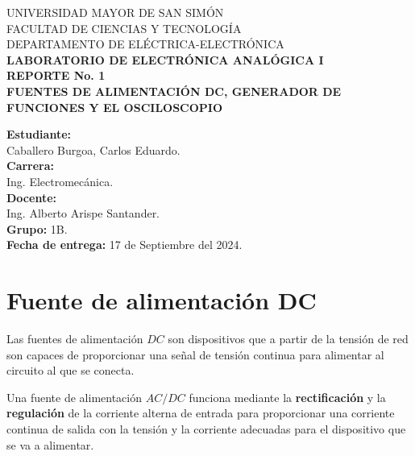 \documentclass[letter,twoside,11pt]{article}
\begin{document}
\begin{titlepage}
    \begin{center}
        {\Large UNIVERSIDAD MAYOR DE SAN SIMÓN}\\
        \vspace*{0.15cm}
        {\large FACULTAD DE CIENCIAS Y TECNOLOGÍA}\\
        \vspace*{0.10cm}
        DEPARTAMENTO DE ELÉCTRICA-ELECTRÓNICA\\
        \vspace*{3.0cm}
        {\Large \textbf{LABORATORIO DE ELECTRÓNICA ANALÓGICA I}}\\
        \vspace*{0.3cm}
        {\Large \textbf{REPORTE No. 1}}\\
        \vspace*{3.5cm}
        {\Large \textbf{FUENTES DE ALIMENTACIÓN DC, GENERADOR DE \\ FUNCIONES Y EL OSCILOSCOPIO}}\\
    \end{center}

    \vspace*{5.8cm}
    \leftskip=7.95cm
    \noindent
    \textbf{Estudiante:}\\
    Caballero Burgoa, Carlos Eduardo.\\
    \newline
    \textbf{Carrera:}\\
    Ing. Electromecánica.\\
    \newline
    \textbf{Docente:}\\
    Ing. Alberto Arispe Santander.\\
    \newline
    \textbf{Grupo:} 1B.\\
    \textbf{Fecha de entrega:} 17 de Septiembre del 2024.\\
\end{titlepage}

\section{Fuente de alimentación DC}
Las fuentes de alimentación $DC$ son dispositivos que a partir de la tensión de
red son capaces de proporcionar una señal de tensión continua para alimentar al
circuito al que se conecta.

Una fuente de alimentación $AC/DC$ funciona mediante la \textbf{rectificación} y
la \textbf{regulación} de la corriente alterna de entrada para proporcionar una
corriente continua de salida con la tensión y la corriente adecuadas para el
dispositivo que se va a alimentar.
\end{document}

